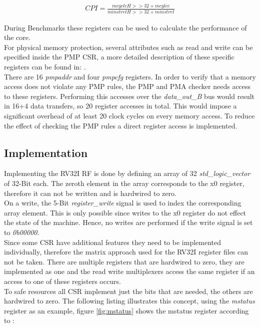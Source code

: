 \begin{align}
	CPI=\frac{mcycleH>>32+mcylce}{minstretH>>32+minstret}\label{eq:CPI}
\end{align}

During Benchmarks these registers can be used to calculate the performance of the core.\\
For physical memory protection, several attributes such as read and write can be specified inside the \ac{PMP} \ac{CSR}, a more detailed description of these specific registers can be found in: \cite{riscv:privileged}.\\
There are 16 \textit{pmpaddr} and four \textit{pmpcfg} registers. In order to verify that a memory access does not violate any \ac{PMP} rules, the PMP and PMA checker needs access to these registers. Performing this accesses over the \textit{data\_out\_B} bus would result in 16+4 data transfers, so 20 register accesses in total. This would impose a significant overhead of at least 20 clock cycles on every memory access. To reduce the effect of checking the \ac{PMP} rules a direct register access is implemented. 
\subsection{Implementation}
Implementing the \ac{RV32I} \ac{RF} is done by defining an array of 32 \textit{std\_logic\_vector} of 32-Bit each. The zeroth element in the array corresponds to the x0 register, therefore it can not be written and is hardwired to zero.\\
On a write, the 5-Bit \textit{register\_write} signal is used to index the corresponding array element. This is only possible since writes to the x0 register do not effect the state of the machine. Hence, no writes are performed if the write signal is set to \textit{0b00000}.\\
Since some \ac{CSR} have additional features they need to be implemented individually, therefore the matrix approach used for the \ac{RV32I} register files can not be taken. There are multiple registers that are hardwired to zero, they are implemented as one and the read write multiplexers access the same register if an access to one of these registers occurs.\\
To safe resources all \ac{CSR} implement just the bits that are needed, the others are hardwired to zero. The following listing illustrates this concept, using the \textit{mstatus} register as an example, figure \ref{fig:mstatus} shows the mstatus register according to \cite{riscv:privileged}:

